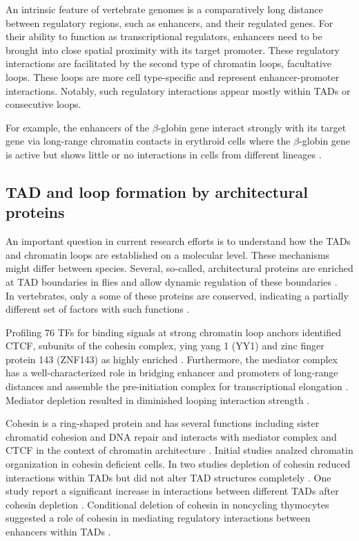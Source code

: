 \documentclass[a4paper,twoside=true,openright,parskip=full,chapterprefix=true,11pt,headings=normal,bibliography=totoc,listof=totoc,titlepage=on,captions=tableabove,draft=false]{scrreprt}
\theoremstyle{definition}
\theoremstyle{definition}
\theoremstyle{definition}
\theoremstyle{remark}
\begin{document}
An intrinsic feature of vertebrate genomes is a comparatively long
distance between regulatory regions, such as enhancers, and their
regulated genes. For their ability to function as transcriptional
regulators, enhancers need to be brought into close spatial proximity
with its target promoter. These regulatory interactions are facilitated
by the second type of chromatin loops, facultative loops. These loops
are more cell type-specific and represent enhancer-promoter
interactions. Notably, such regulatory interactions appear mostly within
TADs or consecutive loops.

For example, the enhancers of the \(\beta\)-globin gene interact
strongly with its target gene via long-range chromatin contacts in
erythroid cells where the \(\beta\)-globin gene is active but shows
little or no interactions in cells from different lineages
\citep{Palstra2003}.

\hypertarget{tad-and-loop-formation-by-architectural-proteins}{%
\subsection{TAD and loop formation by architectural
proteins}\label{tad-and-loop-formation-by-architectural-proteins}}

An important question in current research efforts is to understand how
the TADs and chromatin loops are established on a molecular level. These
mechanisms might differ between species. Several, so-called,
architectural proteins are enriched at TAD boundaries in flies and allow
dynamic regulation of these boundaries
\citep{Bortle2014, Gomez-Diaz2014}.\\
In vertebrates, only a some of these proteins are conserved, indicating
a partially different set of factors with such functions
\citep{Phillips-Cremins2013, Bonev2016}.

Profiling 76 TFs for binding signals at strong chromatin loop anchors
identified CTCF, subunits of the cohesin complex, ying yang 1 (YY1) and
zinc finger protein 143 (ZNF143) as highly enriched \citep{Rao2014}.
Furthermore, the mediator complex has a well-characterized role in
bridging enhancer and promoters of long-range distances and assemble the
pre-initiation complex for transcriptional elongation \citep{Allen2015}.
Mediator depletion resulted in diminished looping interaction strength
\citep{Bonev2016}.

Cohesin is a ring-shaped protein and has several functions including
sister chromatid cohesion and DNA repair and interacts with mediator
complex and CTCF in the context of chromatin architecture
\citep{Bonev2016, Merkenschlager2016}. Initial studies analzed chromatin
organization in cohesin deficient cells. In two studies depletion of
cohesin reduced interactions within TADs but did not alter TAD
structures completely \citep{Seitan2013, Zuin2014}. One study report a
significant increase in interactions between different TADs after
cohesin depletion \citep{Sofueva2013}. Conditional deletion of cohesin
in noncycling thymocytes suggested a role of cohesin in mediating
regulatory interactions between enhancers within TADs
\citep{Ing-simmons2015}.
\end{document}
